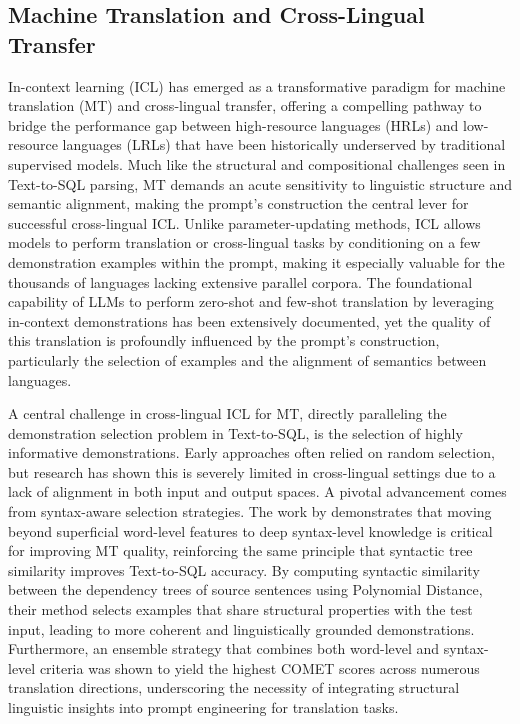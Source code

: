 \documentclass[11pt]{article}
\begin{document}
\subsection{Machine Translation and Cross-Lingual Transfer}

In-context learning (ICL) has emerged as a transformative paradigm for machine translation (MT) and cross-lingual transfer, offering a compelling pathway to bridge the performance gap between high-resource languages (HRLs) and low-resource languages (LRLs) that have been historically underserved by traditional supervised models. Much like the structural and compositional challenges seen in Text-to-SQL parsing, MT demands an acute sensitivity to linguistic structure and semantic alignment, making the prompt's construction the central lever for successful cross-lingual ICL. Unlike parameter-updating methods, ICL allows models to perform translation or cross-lingual tasks by conditioning on a few demonstration examples within the prompt, making it especially valuable for the thousands of languages lacking extensive parallel corpora. The foundational capability of LLMs to perform zero-shot and few-shot translation by leveraging in-context demonstrations has been extensively documented, yet the quality of this translation is profoundly influenced by the prompt's construction, particularly the selection of examples and the alignment of semantics between languages.

A central challenge in cross-lingual ICL for MT, directly paralleling the demonstration selection problem in Text-to-SQL, is the selection of highly informative demonstrations. Early approaches often relied on random selection, but research has shown this is severely limited in cross-lingual settings due to a lack of alignment in both input and output spaces. A pivotal advancement comes from syntax-aware selection strategies. The work by \cite{ref534} demonstrates that moving beyond superficial word-level features to deep syntax-level knowledge is critical for improving MT quality, reinforcing the same principle that syntactic tree similarity improves Text-to-SQL accuracy. By computing syntactic similarity between the dependency trees of source sentences using Polynomial Distance, their method selects examples that share structural properties with the test input, leading to more coherent and linguistically grounded demonstrations. Furthermore, an ensemble strategy that combines both word-level and syntax-level criteria was shown to yield the highest COMET scores across numerous translation directions, underscoring the necessity of integrating structural linguistic insights into prompt engineering for translation tasks.
\end{document}
